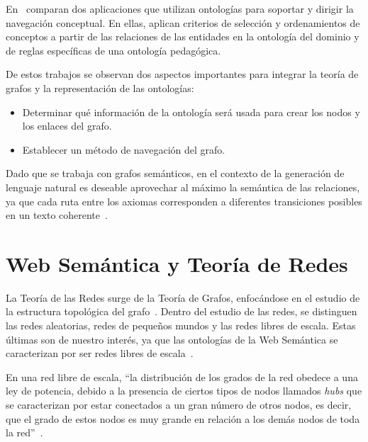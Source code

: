 En~\cite{crampes2007ontology} comparan dos aplicaciones que utilizan ontologías para soportar y dirigir la navegación conceptual. En ellas, aplican criterios de selección y ordenamientos de conceptos a partir de las relaciones de las entidades en la ontología del dominio y de reglas específicas de una ontología pedagógica. 

De estos trabajos se observan dos aspectos importantes para integrar la teoría de grafos y la representación de las ontologías:
\begin{itemize}
    \item Determinar qué información de la ontología será usada para crear los nodos y los enlaces del grafo.
    \item Establecer un método de navegación del grafo.
\end{itemize}

Dado que se trabaja con grafos semánticos, en el contexto de la generación de lenguaje natural es deseable aprovechar al máximo la semántica de las relaciones, ya que cada ruta entre los axiomas corresponden a diferentes transiciones posibles en un texto coherente~\cite{mellish2008natural}.


\section{Web Semántica y Teoría de Redes}
La Teoría de las Redes surge de la Teoría de Grafos, enfocándose en el estudio de la estructura topológica del grafo~\cite{solares2017redes}. Dentro del estudio de las redes, se distinguen las redes aleatorias, redes de pequeños mundos y las redes libres de escala. Estas últimas son de nuestro interés, ya que las ontologías de la Web Semántica se caracterizan por ser redes libres de escala~\cite{zhang2008scale}.

En una red libre de escala, ``la distribución de los grados de la red obedece a una ley de potencia, debido a la presencia de ciertos tipos de nodos llamados \emph{hubs} que se caracterizan por estar conectados a un gran número de otros nodos, es decir, que el grado de estos nodos es muy grande en relación a los demás nodos de toda la red''~\cite{solares2017redes}.